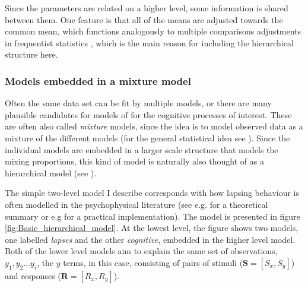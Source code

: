 \documentclass{article}\usepackage{knitr}
\begin{document}
Since the parameters are related on a higher level, some information is shared between them. One feature is that all of the means are adjusted towards the common mean, which functions analogously to multiple comparisons adjustments in frequentist statistics \citep{gelman2012}, which is the main reason for including the hierarchical structure here. 

\subsubsection*{Models embedded in a mixture model} 

Often the same data set can be fit by multiple models, or there are many plausible candidates for models of for the cognitive processes of interest. These are often also called \textit{mixture} models, since the idea is to model observed data as a mixture of the different models (for the general statistical idea see \citet{keller2018}). Since the individual models are embedded in a larger scale structure that models the mixing proportions, this kind of model is naturally also thought of as a hierarchical model (see \citet[Chapter 10]{kruschke2015}).

The simple two-level model I describe corresponds with how lapsing behaviour is often modelled in the psychophysical literature (see e.g. \citet{zeigenfuse2010} for a theoretical summary or e.g \citet{lesmes2015} for a practical implementation). The model is presented in figure \ref{fig:Basic_hierarchical_model}. At the lowest level, the figure shows two models, one labelled \textit{lapses} and the other \textit{cognitive}, embedded in the higher level model. Both of the lower level models aim to explain the same set of observations, $y_1, y_2 \dots y_i$, the $y$ terms, in this case, consisting of pairs of stimuli ($\bm{S} = [S_x, S_y]$) and responses ($\bm{R} = [R_x, R_y]$). 
\end{document}
